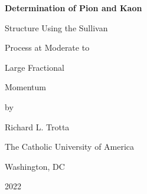 \begin{titlepage}
	\centering
	\vfill
	{\huge\bfseries Determination of Pion and Kaon\par
          Structure Using the Sullivan\par
          Process at Moderate to\par
          Large Fractional\par
          Momentum \par}
        \vfill
        \vspace{2cm}
        
        \vfill
	by\par
	{\Large Richard L. Trotta\par}
	{\large The Catholic University of America\par
          Washington, DC\par}
	{2022}        
\end{titlepage}